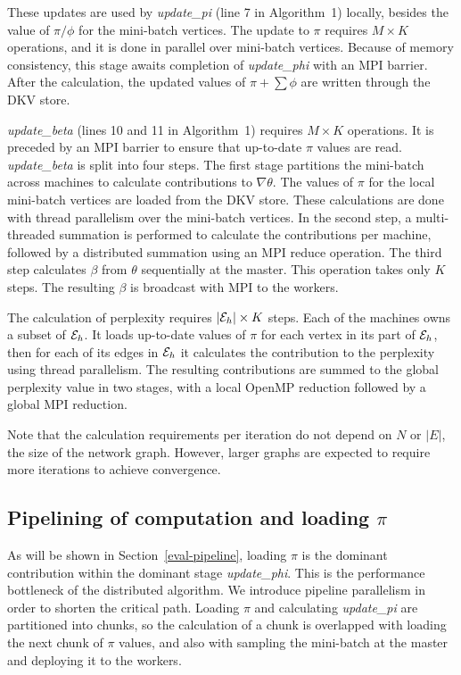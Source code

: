 These updates are used by \textit{update\_pi} (line 7 in Algorithm~1) locally, besides the value of
$\pi/\phi$ for the mini-batch vertices. The update to $\pi$ requires $M\times
K$ operations, and it is done in parallel over mini-batch vertices. Because of
memory consistency, this stage awaits completion of \textit{update\_phi} with
an MPI barrier. After the calculation, the updated values of $\pi+\sum\phi$
are written through the DKV store.

\textit{update\_beta} (lines 10 and 11 in Algorithm~1) requires $M\times K$ operations. It is preceded by an MPI
barrier to ensure that up-to-date $\pi$ values are read. \textit{update\_beta}
is split into four steps. The first stage partitions the mini-batch across
machines to calculate contributions to $\nabla\theta$. The values of $\pi$ for
the local mini-batch vertices are loaded from the DKV store. These calculations
are done with thread parallelism over the mini-batch vertices. In the second step,
a multi-threaded summation is performed to calculate the contributions per
machine, followed by a distributed summation using an MPI reduce operation. The
third step calculates $\beta$ from $\theta$ sequentially at the master. This
operation takes only $K$ steps. The resulting $\beta$ is broadcast with MPI
to the workers.

The calculation of perplexity requires $|\cE_h|\times K$ steps. Each of the
machines owns a subset of $\cE_h$. It loads up-to-date values of $\pi$ for each
vertex in its part of $\cE_h$, then for each of its edges in $\cE_h$ it calculates the
contribution to the perplexity using thread parallelism. The resulting
contributions are summed to the global perplexity value in two stages,
with a local OpenMP reduction followed by a global MPI reduction.

Note that the calculation requirements per iteration do not depend
on $N$ or $|E|$, the size of the network graph. However, larger graphs are
expected to require more iterations to achieve convergence.

\subsection{Pipelining of computation and loading $\pi$}

As will be shown in Section~\ref{eval-pipeline}, loading $\pi$ is the
dominant contribution within the dominant stage \textit{update\_phi}. This
is the performance bottleneck of the distributed algorithm. We introduce
pipeline parallelism in order to shorten the critical path. Loading $\pi$
and calculating \textit{update\_pi} are partitioned into chunks, so the
calculation of a chunk is overlapped with loading the next chunk of $\pi$
values, and also with sampling the mini-batch at the master and deploying
it to the workers.

